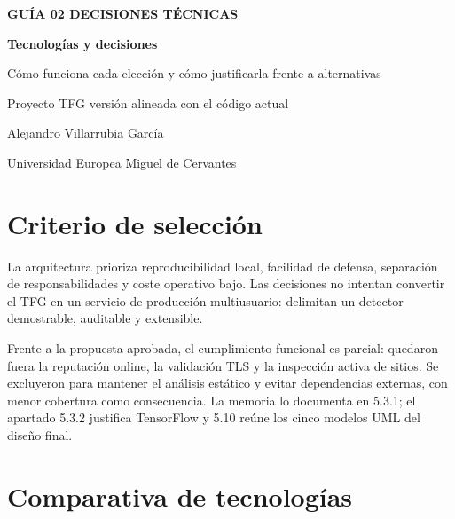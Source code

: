 \documentclass[11pt,a4paper]{article}
\begin{document}
\hypersetup{pageanchor=false}
\begin{titlepage}
  \centering
  \vspace*{2.4cm}
  {\Large\color{uemcgreen}\textbf{GUÍA 02 \textperiodcentered{} DECISIONES TÉCNICAS}\par}
  \vspace{1.5cm}
  {\Huge\bfseries\color{uemcgreen}Tecnologías y decisiones\par}
  \vspace{0.7cm}
  {\large\color{tfgblue}Cómo funciona cada elección y cómo justificarla frente a alternativas\par}
  \vfill
  {\large Proyecto TFG \textperiodcentered{} versión alineada con el código actual\par}
  \vspace{0.35cm}
  {\large Alejandro Villarrubia García\par}
  \vspace{0.35cm}
  {\large Universidad Europea Miguel de Cervantes\par}
\end{titlepage}
\hypersetup{pageanchor=true}
\tableofcontents
\clearpage

\section{Criterio de selección}

La arquitectura prioriza reproducibilidad local, facilidad de defensa, separación de responsabilidades y coste operativo bajo. Las decisiones no intentan convertir el TFG en un servicio de producción multiusuario: delimitan un detector demostrable, auditable y extensible.

Frente a la propuesta aprobada, el cumplimiento funcional es parcial: quedaron fuera la reputación online, la validación TLS y la inspección activa de sitios. Se excluyeron para mantener el análisis estático y evitar dependencias externas, con menor cobertura como consecuencia. La memoria lo documenta en 5.3.1; el apartado 5.3.2 justifica TensorFlow y 5.10 reúne los cinco modelos UML del diseño final.

\section{Comparativa de tecnologías}
\end{document}
